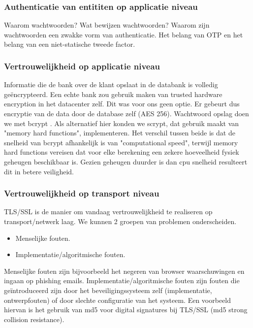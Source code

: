 \documentclass[11pt]{article}
\begin{document}
\subsubsection{Authenticatie van entititen op applicatie niveau}
Waarom wachtwoorden? Wat bewijzen wachtwoorden? Waarom zijn wachtwoorden een zwakke vorm van authenticatie. Het belang van OTP en het belang van een niet-statische tweede factor. \cite{death_of_clever}\cite{pw_habit}

\subsubsection{Vertrouwelijkheid op applicatie niveau}
Informatie die de bank over de klant opslaat in de databank is volledig ge\"encrypteerd. Een echte bank zou gebruik maken van trusted hardware encryption in het datacenter zelf. Dit was voor ons geen optie. Er gebeurt dus encryptie van de data door de database zelf (AES 256). Wachtwoord opslag doen we met bcrypt \cite{bcrypt}. Als alternatief hier konden we scrypt, dat gebruik maakt van "memory hard functions"\cite{scrypt}, implementeren. Het verschil tussen beide is dat de snelheid van bcrypt afhankelijk is van "computational speed", terwijl memory hard functions vereisen dat voor elke berekening een zekere hoeveelheid fysiek geheugen beschikbaar is. Gezien geheugen duurder is dan cpu snelheid resulteert dit in betere veiligheid.

\subsubsection{Vertrouwelijkheid op transport niveau}
TLS/SSL is de manier om vandaag vertrouwelijkheid te realiseren op transport/netwerk laag. We kunnen 2 groepen van problemen onderscheiden.

\begin{itemize}
\item Menselijke fouten.
\item Implementatie/algoritmische fouten.
\end{itemize}
Menselijke fouten zijn bijvoorbeeld het negeren van browser waarschuwingen en ingaan op phishing emails.
Implementatie/algoritmische fouten zijn fouten die ge\"introduceerd zijn door het beveiligingssysteem zelf (implementatie, ontwerpfouten) of door slechte configuratie van het systeem. Een voorbeeld hiervan is het gebruik van md5 voor digital signatures bij TLS/SSL (md5 strong collision resistance).
\end{document}
